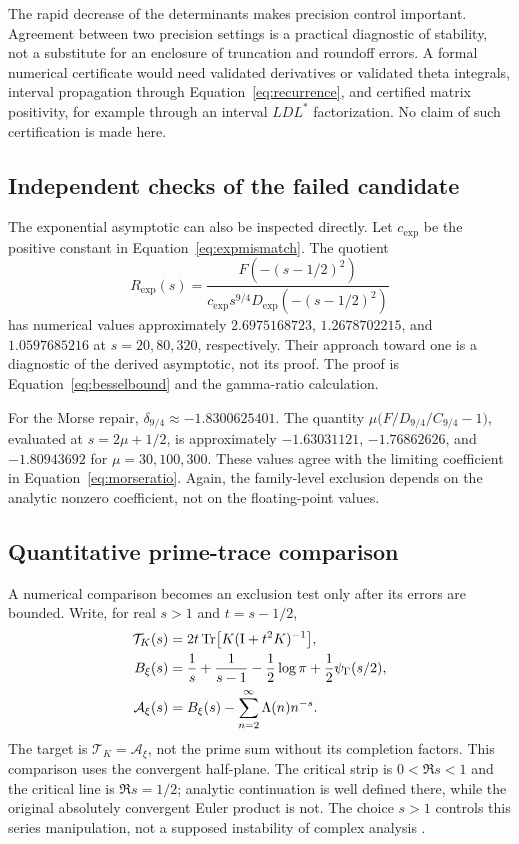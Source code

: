 \documentclass[11pt,letterpaper]{article}
\numberwithin{equation}{section}
\theoremstyle{definition}
\theoremstyle{remark}
\newcommand{\Id}{\mathrm I}
\DeclareMathOperator{\Tr}{Tr}
\begin{document}
The rapid decrease of the determinants makes precision control important. Agreement between two precision settings is a practical diagnostic of stability, not a substitute for an enclosure of truncation and roundoff errors. A formal numerical certificate would need validated derivatives or validated theta integrals, interval propagation through Equation~\eqref{eq:recurrence}, and certified matrix positivity, for example through an interval $LDL^*$ factorization. No claim of such certification is made here.

\subsection{Independent checks of the failed candidate}
The exponential asymptotic can also be inspected directly. Let $c_{\mathrm{exp}}$ be the positive constant in Equation~\eqref{eq:expmismatch}. The quotient
\begin{equation}
 R_{\mathrm{exp}}(s)=
 \frac{F(-(s-1/2)^2)}{c_{\mathrm{exp}}s^{9/4}
 D_{\mathrm{exp}}(-(s-1/2)^2)}
\end{equation}
has numerical values approximately $2.6975168723$, $1.2678702215$, and $1.0597685216$ at $s=20,80,320$, respectively. Their approach toward one is a diagnostic of the derived asymptotic, not its proof. The proof is Equation~\eqref{eq:besselbound} and the gamma-ratio calculation.

For the Morse repair, $\delta_{9/4}\approx-1.8300625401$. The quantity
$\mu\bigl(F/D_{9/4}/C_{9/4}-1\bigr)$, evaluated at $s=2\mu+1/2$, is approximately $-1.63031121$, $-1.76862626$, and $-1.80943692$ for $\mu=30,100,300$. These values agree with the limiting coefficient in Equation~\eqref{eq:morseratio}. Again, the family-level exclusion depends on the analytic nonzero coefficient, not on the floating-point values.

\subsection{Quantitative prime-trace comparison}
\label{subsec:traceerrors}
A numerical comparison becomes an exclusion test only after its errors are bounded. Write, for real $s>1$ and $t=s-1/2$,
\begin{align}
 \mathcal T_K(s)&=2t\Tr\bigl[K(\Id+t^2K)^{-1}\bigr],\label{eq:Tdefinition}\\
 B_\xi(s)&=\frac1s+\frac1{s-1}-\frac12\log\pi
                 +\frac12\psi_\Gamma(s/2),\notag\\
 \mathcal A_\xi(s)&=B_\xi(s)-\sum_{n=2}^{\infty}\Lambda(n)n^{-s}.
 \label{eq:Adefinition}
\end{align}
The target is $\mathcal T_K=\mathcal A_\xi$, not the prime sum without its completion factors. This comparison uses the convergent half-plane. The critical strip is $0<\Re s<1$ and the critical line is $\Re s=1/2$; analytic continuation is well defined there, while the original absolutely convergent Euler product is not. The choice $s>1$ controls this series manipulation, not a supposed instability of complex analysis \cite{titchmarsh,dlmf}.
\end{document}
